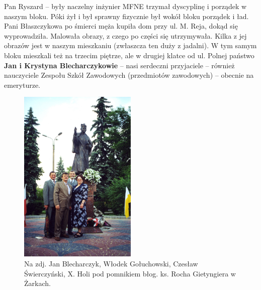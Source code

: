 Pan Ryszard – były naczelny inżynier MFNE trzymał dyscyplinę i porządek w naszym bloku. Póki żył i był sprawny fizycznie był wokół bloku porządek i ład. Pani Błaszczykowa po śmierci męża kupiła dom przy ul. M. Reja, dokąd się wyprowadziła. Malowała obrazy, z czego po części się utrzymywała. Kilka z jej obrazów jest w naszym mieszkaniu (zwłaszcza ten duży z jadalni). W tym samym bloku mieszkali też na trzecim piętrze, ale w drugiej klatce od ul. Polnej państwo\textbf{ Jan i Krystyna Blecharczykowie} – nasi serdeczni przyjaciele – również nauczyciele Zespołu Szkół Zawodowych (przedmiotów zawodowych) – obecnie na emeryturze.
\begin{figure}[!h]
\begin{center}
\includegraphics[width=0.5\textwidth]{photo/krystyna_jan_blecharczykowie.jpg}
\caption[Jan Blecharczyk, Włodek Gołuchowski, Czesław Świerczyński, X. Holi pod pomnikiem błog. ks. Rocha Gietyngiera w Żarkach]{Na zdj. Jan Blecharczyk, Włodek Gołuchowski, Czesław Świerczyński, X. Holi pod pomnikiem błog. ks. Rocha Gietyngiera w Żarkach.}
\end{center}
\end{figure}

